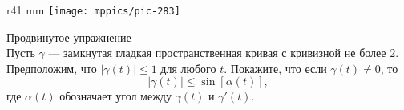 \begin{wrapfigure}{r}{41 mm}
\vskip-4mm
\centering
\texttt{[image: mppics/pic-283]}
\vskip0mm
\end{wrapfigure}

\begin{thm}{Продвинутое упражнение}\label{ex:gromov-twist}\\
Пусть $\gamma$ --- замкнутая гладкая пространственная кривая с кривизной не более $2$.
Предположим, что $|\gamma(t)|\le 1$ для любого $t$.
Покажите, что если $\gamma(t)\ne 0$, то 
\[|\gamma(t)| \le \sin [\alpha(t)],\]
где $\alpha(t)$ обозначает угол между $\gamma(t)$ и $\gamma'(t)$.
\end{thm}

